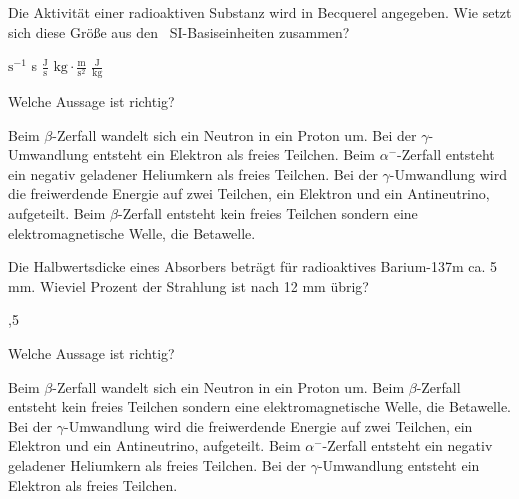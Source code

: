 \documentclass[11pt]{exam}
\begin{document}
\setlength{\voffset}{-0.5in}
\setlength{\headsep}{5pt}

\hspace{2mm}
 \hspace{5mm}
\vspace{4mm}

\begin{questions}

\question Die Aktivität einer radioaktiven Substanz wird in Becquerel angegeben. Wie setzt sich diese Größe aus den  SI-Basiseinheiten zusammen?

\begin{choices}
	\choice \( \text{s}^{-1} \)
	\choice s
	\choice \( \frac{\text{J}}{\text{s}} \)
	\choice \( \text{kg}\cdot\frac{\text{m}}{\text{s}^2} \)
	\choice \( \frac{\text{J}}{\text{kg}} \)
\end{choices}

\vspace{3mm}\question Welche Aussage ist richtig?

\begin{choices}
	\choice Beim \( \beta \)-Zerfall wandelt sich ein Neutron in ein Proton um.
	\choice Bei der \( \gamma \)-Umwandlung entsteht ein Elektron als freies Teilchen.
	\choice Beim \( \alpha^- \)-Zerfall entsteht ein negativ geladener Heliumkern als freies Teilchen.
	\choice Bei der \( \gamma \)-Umwandlung wird die freiwerdende Energie auf zwei Teilchen, ein Elektron und ein Antineutrino, aufgeteilt.
	\choice Beim \( \beta \)-Zerfall entsteht kein freies Teilchen sondern eine elektromagnetische Welle, die Betawelle.
\end{choices}

\vspace{3mm}\question Die Halbwertsdicke eines Absorbers beträgt für radioaktives Barium-137m ca. 5 mm. Wieviel Prozent der Strahlung ist nach 12 mm übrig?

\begin{choices}
	,5 %
\end{choices}

\vspace{3mm}\question Welche Aussage ist richtig?

\begin{choices}
	\choice Beim \( \beta \)-Zerfall wandelt sich ein Neutron in ein Proton um.
	\choice Beim \( \beta \)-Zerfall entsteht kein freies Teilchen sondern eine elektromagnetische Welle, die Betawelle.
	\choice Bei der \( \gamma \)-Umwandlung wird die freiwerdende Energie auf zwei Teilchen, ein Elektron und ein Antineutrino, aufgeteilt.
	\choice Beim \( \alpha^- \)-Zerfall entsteht ein negativ geladener Heliumkern als freies Teilchen.
	\choice Bei der \( \gamma \)-Umwandlung entsteht ein Elektron als freies Teilchen.
\end{choices}


\end{questions}
\end{document}
